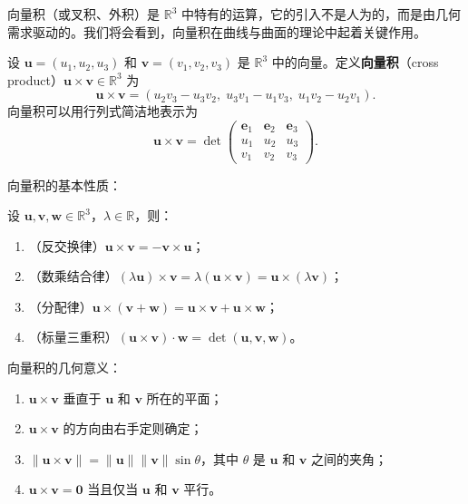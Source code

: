 向量积（或叉积、外积）是 $\mathbb{R}^3$ 中特有的运算，它的引入不是人为的，而是由几何需求驱动的。我们将会看到，向量积在曲线与曲面的理论中起着关键作用。

\begin{Definition}[向量积]\label{def:cross-product-ch1}
设 $\mathbf{u} = (u_1, u_2, u_3)$ 和 $\mathbf{v} = (v_1, v_2, v_3)$ 是 $\mathbb{R}^3$ 中的向量。定义\textbf{向量积}（cross product）$\mathbf{u} \times \mathbf{v} \in \mathbb{R}^3$ 为
\[
\mathbf{u} \times \mathbf{v} = (u_2 v_3 - u_3 v_2,\; u_3 v_1 - u_1 v_3,\; u_1 v_2 - u_2 v_1).
\]
向量积可以用行列式简洁地表示为
\[
\mathbf{u} \times \mathbf{v} = \det\begin{pmatrix}
\mathbf{e}_1 & \mathbf{e}_2 & \mathbf{e}_3 \\
u_1 & u_2 & u_3 \\
v_1 & v_2 & v_3
\end{pmatrix}.
\]
\end{Definition}

向量积的基本性质：

\begin{Proposition}[向量积的性质]\label{prop:cross-product-ch1}
设 $\mathbf{u}, \mathbf{v}, \mathbf{w} \in \mathbb{R}^3$，$\lambda \in \mathbb{R}$，则：
\begin{enumerate}
\item（反交换律）$\mathbf{u} \times \mathbf{v} = -\mathbf{v} \times \mathbf{u}$；
\item（数乘结合律）$(\lambda \mathbf{u}) \times \mathbf{v} = \lambda (\mathbf{u} \times \mathbf{v}) = \mathbf{u} \times (\lambda \mathbf{v})$；
\item（分配律）$\mathbf{u} \times (\mathbf{v} + \mathbf{w}) = \mathbf{u} \times \mathbf{v} + \mathbf{u} \times \mathbf{w}$；
\item（标量三重积）$(\mathbf{u} \times \mathbf{v}) \cdot \mathbf{w} = \det(\mathbf{u}, \mathbf{v}, \mathbf{w})$。
\end{enumerate}
\end{Proposition}

向量积的几何意义：

\begin{Proposition}[向量积的几何意义]\label{prop:cross-product-geometry-ch1}
\begin{enumerate}
\item $\mathbf{u} \times \mathbf{v}$ 垂直于 $\mathbf{u}$ 和 $\mathbf{v}$ 所在的平面；
\item $\mathbf{u} \times \mathbf{v}$ 的方向由右手定则确定；
\item $\|\mathbf{u} \times \mathbf{v}\| = \|\mathbf{u}\| \|\mathbf{v}\| \sin\theta$，其中 $\theta$ 是 $\mathbf{u}$ 和 $\mathbf{v}$ 之间的夹角；
\item $\mathbf{u} \times \mathbf{v} = \mathbf{0}$ 当且仅当 $\mathbf{u}$ 和 $\mathbf{v}$ 平行。
\end{enumerate}
\end{Proposition}

